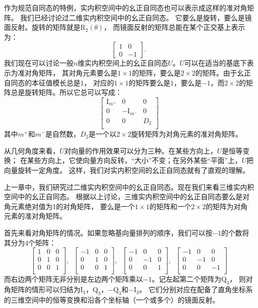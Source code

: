 \documentclass[12pt,UTF8]{ctexbook}
\begin{document}
作为规范自同态的特例，实内积空间中的幺正自同态也可以表示成这样的准对角矩阵。
我们已经讨论过二维实内积空间中的幺正自同态。
它要么是旋转，要么是镜面反射。旋转的矩阵就是$\mathrm{R}_2(\theta)$，
而镜面反射的矩阵总能在某个正交基上表示为：
$$ \begin{bmatrix}
    1 & 0 \\ 0 & -1
\end{bmatrix}.$$
我们现在可以讨论一般$n$维实内积空间上的幺正自同态$U$。$U$可以在适当的基底下表示为准对角矩阵，
其对角元素要么是$1\times 1$的矩阵，要么是$2\times 2$的矩阵。由于幺正自同态的本征值模长总是$1$，
对应的$1\times 1$的矩阵要么是$1$，要么是$-1$，而$2\times 2$的矩阵总是旋转矩阵。所以它总可以写成：
$$ \begin{bmatrix}
    \mathrm{I}_{m^+} & 0 & 0 \\
    0 & -\mathrm{I}_{m^-} & 0 \\
    0 & 0 & D_2 \\
   \end{bmatrix} $$
其中$m^+$和$m^-$是自然数，$D_2$是一个以$2\times 2$旋转矩阵为对角元素的准对角矩阵。

从几何角度来看，$U$对向量的作用效果可以分为三种。在某些方向上，$U$是恒等变换；
在某些方向上，它使向量方向反转，“大小”不变；在另外某些“平面”上，$U$把向量旋转一定角度。
这样，我们对实内积空间的幺正自同态就有了直观的理解。

上一章中，我们研究过二维实内积空间中的幺正自同态。现在我们来看三维实内积空间中的幺正自同态。
根据以上讨论，三维实内积空间中的幺正自同态要么是对角元素绝对值为1的对角矩阵，
要么是一个$1\times 1$的矩阵和一个$2\times 2$的矩阵为对角元素的准对角矩阵。

首先来看对角矩阵的情况。如果忽略基向量排列的顺序，我们可以按$-1$的个数将其分为$4$个矩阵：
$$ \begin{bmatrix}
    1 & 0 & 0 \\
    0 & 1 & 0 \\
    0 & 0 & 1 \\
\end{bmatrix}, \,\,\, \begin{bmatrix}
    -1 & 0 & 0 \\
    0 & 1 & 0 \\
    0 & 0 & 1 \\
\end{bmatrix}, \,\,\, \begin{bmatrix}
    -1 & 0 & 0 \\
    0 & -1 & 0 \\
    0 & 0 & 1 \\
\end{bmatrix}, \,\,\, \begin{bmatrix}
    -1 & 0 & 0 \\
    0 & -1 & 0 \\
    0 & 0 & -1 \\
\end{bmatrix}$$
而右边两个矩阵无非分别是左边两个矩阵乘以$-1$。记左起第二个矩阵为$\mathrm{Q}_3$，
则对角矩阵的情形可以归结为$\mathrm{I}_3$，$\mathrm{Q}_3$，$-\mathrm{Q}_3$和$-\mathrm{I}_3$。
它们分别对应在配备了直角坐标系的三维空间中的恒等变换和沿各个坐标轴（一个或多个）的镜面反射。
\end{document}
